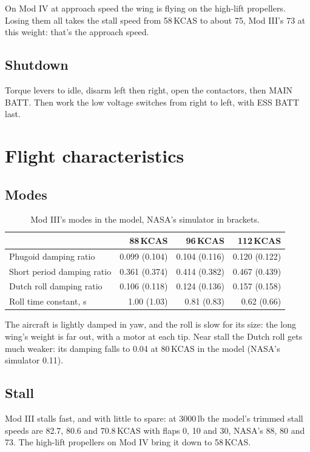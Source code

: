 \documentclass[11pt,a4paper,oneside]{book}
\newcommand{\ann}[1]{\textsf{\small #1}}
\begin{document}
\begin{warning}
On Mod IV at approach speed the wing is flying on the high-lift propellers. Losing them all takes the stall speed from 58\,KCAS to about 75, Mod III's 73 at this weight: that's the approach speed.
\end{warning}

\section{Shutdown}
Torque levers to idle, disarm left then right, open the contactors, then \ann{MAIN BATT}. Then work the low voltage switches from right to left, with \ann{ESS BATT} last.

\chapter{Flight characteristics}
\section{Modes}
\begin{table}[H]\centering\small
\caption{Mod III's modes in the model, NASA's simulator in brackets.}
\begin{tabular}{@{}lrrr@{}}
\toprule
 & 88\,KCAS & 96\,KCAS & 112\,KCAS \\
\midrule
Phugoid damping ratio & 0.099 (0.104) & 0.104 (0.116) & 0.120 (0.122) \\
Short period damping ratio & 0.361 (0.374) & 0.414 (0.382) & 0.467 (0.439) \\
Dutch roll damping ratio & 0.106 (0.118) & 0.124 (0.136) & 0.157 (0.158) \\
Roll time constant, s & 1.00 (1.03) & 0.81 (0.83) & 0.62 (0.66) \\
\bottomrule
\end{tabular}
\end{table}
The aircraft is lightly damped in yaw, and the roll is slow for its size: the long wing's weight is far out, with a motor at each tip. Near stall the Dutch roll gets much weaker: its damping falls to 0.04 at 80\,KCAS in the model (NASA's simulator 0.11).

\section{Stall}
Mod III stalls fast, and with little to spare: at 3000\,lb the model's trimmed stall speeds are 82.7, 80.6 and 70.8\,KCAS with flaps 0, 10 and 30, NASA's 88, 80 and 73. The high-lift propellers on Mod IV bring it down to 58\,KCAS.
\end{document}
